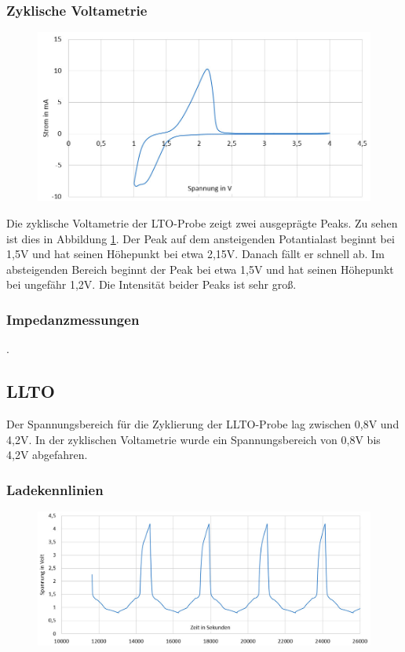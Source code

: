 \documentclass[a4paper, 11pt, headsepline,footsepline,twoside,abstract]{scrbook}
\begin{document}
\subsubsection{Zyklische Voltametrie}
\begin{figure}
	\centering
	\includegraphics[width=0.85\columnwidth]{images/CV_LTO.jpg}
	\caption{}
	\label{cv_LTO}
\end{figure}
Die zyklische Voltametrie der LTO-Probe zeigt zwei ausgeprägte Peaks. Zu sehen ist dies in Abbildung \ref{cv_LTO}. Der Peak auf dem ansteigenden Potantialast beginnt bei 1,5V und hat seinen Höhepunkt bei etwa 2,15V. Danach fällt er schnell ab. Im absteigenden Bereich beginnt der Peak bei etwa 1,5V und hat seinen Höhepunkt bei ungefähr 1,2V. Die Intensität beider Peaks ist sehr groß.
\subsubsection{Impedanzmessungen}
.
\newpage
\subsection{LLTO}
Der Spannungsbereich für die Zyklierung der LLTO-Probe lag zwischen 0,8V und 4,2V. In der zyklischen Voltametrie wurde ein Spannungsbereich von 0,8V bis 4,2V abgefahren.
\subsubsection{Ladekennlinien}
\begin{figure}
	\centering
	\includegraphics[width=1.0\columnwidth]{images/GCPL_LLTO.jpg}
	\caption{}
	\label{gcpl_LLTO}
\end{figure}
\end{document}
